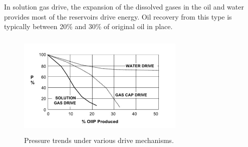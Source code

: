 \begin{description}[style=nextline]
\item [\textbf{Solution gas drive}] 
In solution gas drive, the expansion of the dissolved gases 
in the oil and water provides most of the reservoirs drive energy.
Oil recovery from this type is typically between 20\% and 30\% of original oil in place.

\begin{figure}[ht]
\begin{center}
      \includegraphics[width=8cm, height=5cm]{figures/ReservoirPerformancePrimary.png}
       \end{center}
     \caption{Pressure trends under various drive mechanisms.}
  \label{fig:ReservoirPerformancePrimary}
\end{figure}


\end{description}
